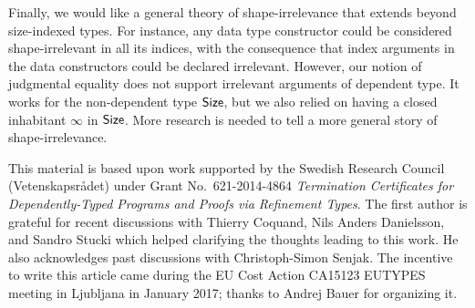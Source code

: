\documentclass[acmsmall%
]{acmart}\settopmatter{printfolios=true}
\newcommand{\SHORTVERSION}[1]{#1}
\begin{document}
Finally, we would like a general theory of shape-irrelevance that
extends beyond size-indexed types.  For instance, any data type
constructor could be considered shape-irrelevant in all its
indices, with the consequence that index arguments in the data constructors
could be declared irrelevant.
However, our notion of judgmental equality does not support
irrelevant arguments of dependent type.
It works for the non-dependent type $\mathsf{Size}$, but we also
relied on having a closed inhabitant $\infty$ in $\mathsf{Size}$.
More research is needed to tell a more general story of shape-irrelevance.







\begin{acks}                            %
  This material is based upon work supported by the
  Swedish Research Council (Vetenskapsr\aa{}det)
  under Grant
  No.~621-2014-4864 \emph{Termination Certificates for Dependently-Typed Programs and Proofs via Refinement Types}.
  The first author is grateful for recent discussions with Thierry Coquand, Nils Anders Danielsson, and Sandro Stucki
  which helped clarifying the thoughts leading to this work.
  He also acknowledges past discussions with Christoph-Simon Senjak.
  The incentive to write this article came during the EU Cost Action CA15123 EUTYPES meeting in Ljubljana in January 2017; thanks to Andrej Bauer for organizing it.
\end{acks}

\SHORTVERSION{\clearpage}





\end{document}
